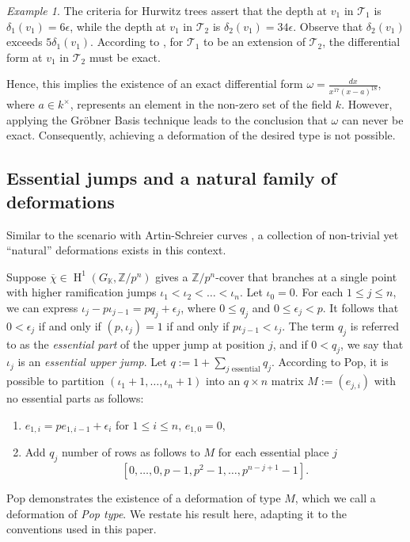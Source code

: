 \documentclass{compositio}
\theoremstyle{remark}
\newtheorem{example}[theorem]{Example}
\theoremstyle{remark}
\DeclareMathOperator{\cohom}{H}
\begin{document}
\begin{example}
The criteria for Hurwitz trees assert that the depth at $v_1$ in $\mathcal{T}_1$ is $\delta_1(v_1) = 6\epsilon$, while the depth at $v_1$ in $\mathcal{T}_2$ is $\delta_2(v_1) = 34\epsilon$. Observe that $\delta_2(v_1)$ exceeds $5\delta_1(v_1)$. According to \cite[Theorem 3.4.2 (ii) (b)]{2020arXiv201013614D}, for $\mathcal{T}_1$ to be an extension of $\mathcal{T}_2$, the differential form at $v_1$ in $\mathcal{T}_2$ must be exact.

Hence, this implies the existence of an exact differential form $\omega = \frac{dx}{x^{17}(x-a)^{18}}$, where $a \in k^{\times}$, represents an element in the non-zero set of the field $k$. However, applying the Gr{\"o}bner Basis technique \cite[\S 6.1]{2020arXiv200203719D} leads to the conclusion that $\omega$ can never be exact. Consequently, achieving a deformation of the desired type is not possible.
\end{example}










\subsection{Essential jumps and a natural family of deformations}
\label{secessentialdeform}
Similar to the scenario with Artin-Schreier curves \cite[\S 4.1]{MR2985514}, a collection of non-trivial yet ``natural'' deformations exists in this context.

Suppose $\overline{\chi} \in \cohom^1(G_\mathbb{K}, \mathbb{Z}/p^n)$ gives a $\mathbb{Z}/p^n$-cover that branches at a single point with higher ramification jumps $\iota_1<\iota_2<\ldots<\iota_n$. Let $\iota_0=0$. For each $1 \le j \le n$, we can express $\iota_j -p\iota_{j-1}=pq_j+\epsilon_j$, where $0 \le q_j$ and $0 \le \epsilon_j <p$. It follows that $0< \epsilon_j$ if and only if $(p, \iota_j)=1$ if and only if $p \iota_{j-1}<\iota_j$. The term $q_j$ is referred to as the \textit{essential part} of the upper jump at position $j$, and if $0<q_j$, we say that $\iota_j$ is an \textit{essential upper jump}. Let $q:=1+\sum_{j \text{ essential}} q_j$. According to Pop, it is possible to partition $(\iota_1+1, \ldots, \iota_{n}+1)$ into an $q \times n$ matrix $M:=(e_{j,i})$ with no essential parts as follows:
\begin{enumerate}
    \item $e_{1,i}=pe_{1,i-1}+\epsilon_i$ for $1 \le i \le n$, $e_{1,0}=0$,
    \item Add $q_j$ number of rows as follows to $M$ for each essential place $j$
    \begin{equation}
    \label{eqnrowqj}
        [0, \ldots, 0, p-1, p^2-1, \ldots, p^{n-j+1}-1].
    \end{equation}
\end{enumerate}
Pop demonstrates the existence of a deformation of type $M$, which we call a deformation of \textit{Pop type}. We restate his result here, adapting it to the conventions used in this paper.
\end{document}
